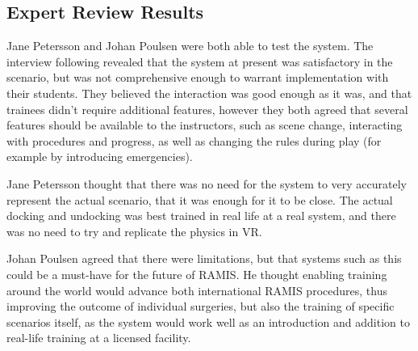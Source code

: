 \subsection{Expert Review Results}

Jane Petersson and Johan Poulsen were both able to test the system. The interview following revealed that the system at present was satisfactory in the scenario, but was not comprehensive enough to warrant implementation with their students. They believed the interaction was good enough as it was, and that trainees didn't require additional features, however they both agreed that several features should be available to the instructors, such as scene change, interacting with procedures and progress, as well as changing the rules during play (for example by introducing emergencies). 

Jane Petersson thought that there was no need for the system to very accurately represent the actual scenario, that it was enough for it to be close. The actual docking and undocking was best trained in real life at a real system, and there was no need to try and replicate the physics in VR.

Johan Poulsen agreed that there were limitations, but that systems such as this could be a must-have for the future of RAMIS. He thought enabling training around the world would advance both international RAMIS procedures, thus improving the outcome of individual surgeries, but also the training of specific scenarios itself, as the system would work well as an introduction and addition to real-life training at a licensed facility.